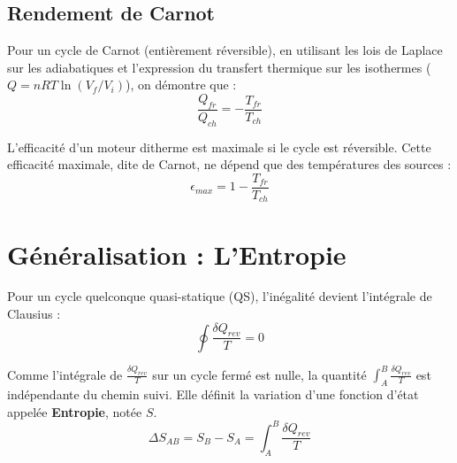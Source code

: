 \documentclass[french]{yLectureNote}
\begin{document}


\subsection{Rendement de Carnot}
Pour un cycle de Carnot (entièrement réversible), en utilisant les lois de Laplace sur les adiabatiques et l'expression du transfert thermique sur les isothermes ($Q = nRT \ln(V_f/V_i)$), on démontre que :
$$\frac{Q_{fr}}{Q_{ch}} = -\frac{T_{fr}}{T_{ch}}$$

\begin{proposition}
    L'efficacité d'un moteur ditherme est maximale si le cycle est réversible. Cette efficacité maximale, dite de Carnot, ne dépend que des températures des sources :
    $$\epsilon_{max} = 1 - \frac{T_{fr}}{T_{ch}}$$
\end{proposition}


\section{Généralisation : L'Entropie}

Pour un cycle quelconque quasi-statique (QS), l'inégalité devient l'intégrale de Clausius :
$$\oint \frac{\delta Q_{rev}}{T} = 0$$

\begin{theorem}
    Comme l'intégrale de $\frac{\delta Q_{rev}}{T}$ sur un cycle fermé est nulle, la quantité $\int_A^B \frac{\delta Q_{rev}}{T}$ est indépendante du chemin suivi. Elle définit la variation d'une fonction d'état appelée \textbf{Entropie}, notée $S$.
    $$\Delta S_{AB} = S_B - S_A = \int_A^B \frac{\delta Q_{rev}}{T}$$
\end{theorem}

\end{document}
